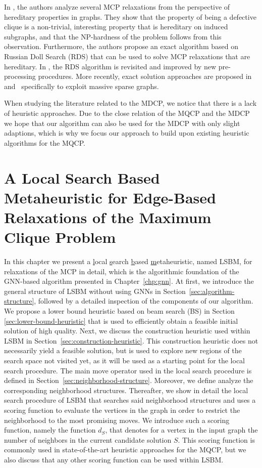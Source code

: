 \documentclass[draft,final]{vutinfth} %
\begin{document}
In \cite{Trukhanov2013}, the authors analyze several MCP relaxations from the perspective of hereditary properties in graphs. They show that the property of being a defective clique is a non-trivial, interesting property that is hereditary on induced subgraphs, and that the NP-hardness of the problem follows from this observation. Furthermore, the authors propose an exact algorithm based on Russian Doll Search (RDS) that can be used to solve MCP relaxations that are hereditary. In \cite{GSCHWIND2018131}, the RDS algorithm is revisited and improved by new pre-processing procedures. 
More recently, exact solution approaches are proposed in~\cite{chen2021computing} and~\cite{gao2022exact} specifically to exploit massive sparse graphs. 

When studying the literature related to the MDCP, we notice that there is a lack of heuristic approaches. Due to the close relation of the MQCP and the MDCP we hope that our algorithm can also be used for the MDCP with only slight adaptions, which is why we focus our approach to build upon existing heuristic algorithms for the MQCP. 

\chapter{A Local Search Based Metaheuristic for Edge-Based Relaxations of the Maximum Clique Problem}\label{chp:local-search-algorithm}

In this chapter we present a \underline{l}ocal \underline{s}earch \underline{b}ased \underline{m}etaheuristic, named LSBM, for relaxations of the MCP in detail, which is the algorithmic foundation of the GNN-based algorithm presented in Chapter~\ref{chp:gnn}. 
At first, we introduce the general structure of LSBM without using GNNs in Section~\ref{sec:algorithm-structure}, followed by a detailed inspection of the components of our algorithm. We propose a lower bound heuristic based on beam search (BS) in Section \ref{sec:lower-bound-heuristic} that is used to efficiently obtain a feasible initial solution of high quality. 
Next, we discuss the construction heuristic used within LSBM in Section~\ref{sec:construction-heuristic}. This construction heuristic does not necessarily yield a feasible solution, but is used to explore new regions of the search space not visited yet, as it will be used as a starting point for the local search procedure. 
The main move operator used in the local search procedure is defined in Section~\ref{sec:neighborhood-structure}. Moreover, we define analyze the corresponding neighborhood structures. 
Thereafter, we show in detail the local search procedure of LSBM that searches said neighborhood structures and uses a scoring function to evaluate the vertices in the graph in order to restrict the neighborhood to the most promising moves. We introduce such a scoring function, namely the function $d_S$, that denotes for a vertex in the input graph the number of neighbors in the current candidate solution $S$. This scoring function is commonly used in state-of-the-art heuristic approaches for the MQCP, but we also discuss that any other scoring function can be used within LSBM. 
\end{document}
